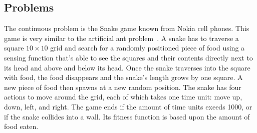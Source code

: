 \subsection{Problems}

The continuous problem is the Snake game known from Nokia cell phones. This game is very similar to the artificial ant problem~\cite[p. 147--155]{koza1992genetic}. A snake has to traverse a square $10\times 10$ grid and search for a randomly positioned piece of food using a sensing function that's able to see the squares and their contents directly next to its head and above and below its head. Once the snake traverses into the square with food, the food disappears and the snake's length grows by one square. A new piece of food then spawns at a new random position. The snake has four actions to move around the grid, each of which takes one time unit: move up, down, left, and right. The game ends if the amount of time units exeeds \num{1000}, or if the snake collides into a wall.  Its fitness function is based upon the amount of food eaten.
